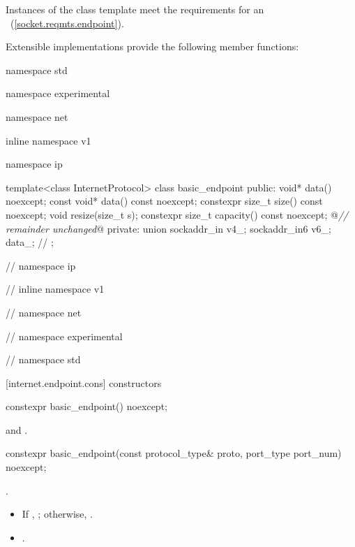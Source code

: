 \pnum
Instances of the  class template meet the requirements for an ~(\ref{socket.reqmts.endpoint}).

%
\pnum
 Extensible implementations provide the following member functions:

\begin{codeblock}
namespace std {
namespace experimental {
namespace net {
inline namespace v1 {
namespace ip {

  template<class InternetProtocol>
  class basic_endpoint
  {
  public:
    void* data() noexcept;
    const void* data() const noexcept;
    constexpr size_t size() const noexcept;
    void resize(size_t s);
    constexpr size_t capacity() const noexcept;
    @\textit{// remainder unchanged}@
  private:
    union
    {
      sockaddr_in v4_;
      sockaddr_in6 v6_;
    } data_; // \expos
  };

} // namespace ip
} // inline namespace v1
} // namespace net
} // namespace experimental
} // namespace std
\end{codeblock}


[internet.endpoint.cons]{ constructors}

\begin{itemdecl}
constexpr basic_endpoint() noexcept;
\end{itemdecl}

\begin{itemdescr}
\pnum
\postconditions {} and .
\end{itemdescr}

\begin{itemdecl}
constexpr basic_endpoint(const protocol_type& proto,
                         port_type port_num) noexcept;
\end{itemdecl}

\begin{itemdescr}
\pnum
\requires {}.

\pnum
\postconditions
\begin{itemize}
\item
 If , ; otherwise, .
\item
{}.
\end{itemize}
\end{itemdescr}

